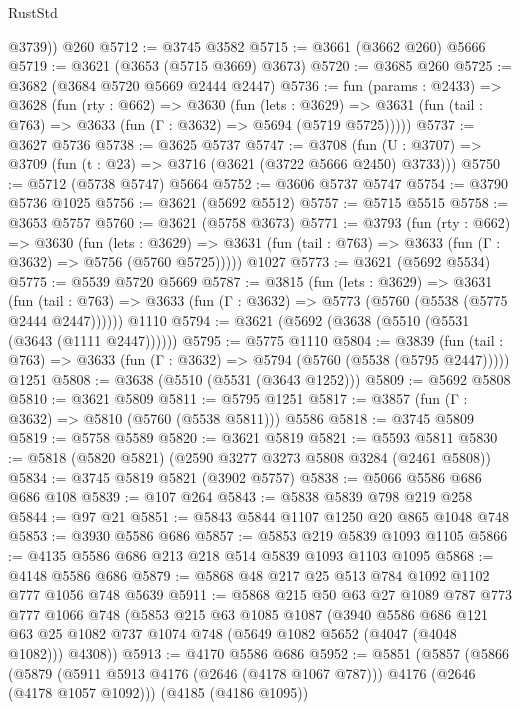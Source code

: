 \begin{lexlean}{RustStd}
\begin{coremodule}
        @3739))
    @260
@5712 := @3745 @3582
@5715 := @3661 (@3662 @260) @5666
@5719 := @3621 (@3653 (@5715 @3669) @3673)
@5720 := @3685 @260
@5725 := @3682 (@3684 @5720 @5669 @2444 @2447)
@5736 := fun (params : @2433) =>
  @3628
    (fun (rty : @662) =>
    @3630
      (fun (lets : @3629) =>
      @3631 (fun (tail : @763) => @3633 (fun (Γ : @3632) => @5694 (@5719 @5725)))))
@5737 := @3627 @5736
@5738 := @3625 @5737
@5747 := @3708 (fun (U : @3707) => @3709 (fun (t : @23) => @3716 (@3621 (@3722 @5666 @2450) @3733)))
@5750 := @5712 (@5738 @5747) @5664
@5752 := @3606 @5737 @5747
@5754 := @3790 @5736 @1025
@5756 := @3621 (@5692 @5512)
@5757 := @5715 @5515
@5758 := @3653 @5757
@5760 := @3621 (@5758 @3673)
@5771 := @3793
    (fun (rty : @662) =>
    @3630
      (fun (lets : @3629) =>
      @3631 (fun (tail : @763) => @3633 (fun (Γ : @3632) => @5756 (@5760 @5725)))))
    @1027
@5773 := @3621 (@5692 @5534)
@5775 := @5539 @5720 @5669
@5787 := @3815
    (fun (lets : @3629) =>
    @3631
      (fun (tail : @763) => @3633 (fun (Γ : @3632) => @5773 (@5760 (@5538 (@5775 @2444 @2447))))))
    @1110
@5794 := @3621 (@5692 (@3638 (@5510 (@5531 (@3643 (@1111 @2447))))))
@5795 := @5775 @1110
@5804 := @3839
    (fun (tail : @763) => @3633 (fun (Γ : @3632) => @5794 (@5760 (@5538 (@5795 @2447)))))
    @1251
@5808 := @3638 (@5510 (@5531 (@3643 @1252)))
@5809 := @5692 @5808
@5810 := @3621 @5809
@5811 := @5795 @1251
@5817 := @3857 (fun (Γ : @3632) => @5810 (@5760 (@5538 @5811))) @5586
@5818 := @3745 @5809
@5819 := @5758 @5589
@5820 := @3621 @5819
@5821 := @5593 @5811
@5830 := @5818 (@5820 @5821) (@2590 @3277 @3273 @5808 @3284 (@2461 @5808))
@5834 := @3745 @5819 @5821 (@3902 @5757)
@5838 := @5066 @5586 @686 @686 @108
@5839 := @107 @264
@5843 := @5838 @5839 @798 @219 @258
@5844 := @97 @21
@5851 := @5843 @5844 @1107 @1250 @20 @865 @1048 @748
@5853 := @3930 @5586 @686
@5857 := @5853 @219 @5839 @1093 @1105
@5866 := @4135 @5586 @686 @213 @218 @514 @5839 @1093 @1103 @1095
@5868 := @4148 @5586 @686
@5879 := @5868 @48 @217 @25 @513 @784 @1092 @1102 @777 @1056 @748 @5639
@5911 := @5868
    @215
    @50
    @63
    @27
    @1089
    @787
    @773
    @777
    @1066
    @748
    (@5853
      @215
      @63
      @1085
      @1087
      (@3940
        @5586
        @686
        @121
        @63
        @25
        @1082
        @737
        @1074
        @748
        (@5649 @1082 @5652 (@4047 (@4048 @1082)))
        @4308))
@5913 := @4170 @5586 @686
@5952 := @5851
    (@5857
      (@5866
        (@5879 (@5911 @5913 @4176 (@2646 (@4178 @1067 @787))) @4176 (@2646 (@4178 @1057 @1092)))
        (@4185 (@4186 @1095))

\end{coremodule}
\end{lexlean}
